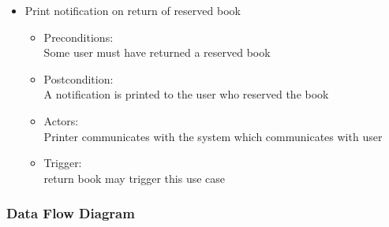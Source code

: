 \documentclass{article}
\begin{document}
\begin{enumerate}
\begin{itemize}
\item Print notification on return of reserved book\\ 
\begin{itemize}
\item Preconditions:\\ Some user must have returned a reserved book \\ 
 \item Postcondition:\\ A notification is printed to the user who reserved the book\\ 
 \item Actors: \\ Printer communicates with the system which communicates with user\\ 
 \item Trigger:\\ return book may trigger this use case\\ 
\end{itemize}

\end{itemize}
\end{enumerate}

\subsubsection*{Data Flow Diagram}
\end{document}
